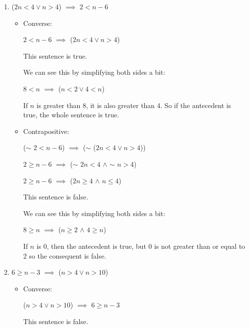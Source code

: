 \documentclass[12pt,letterpaper]{article}
\begin{document}
\begin{enumerate}
\begin{enumerate}
\begin{enumerate}
\begin{itemize}
              \end{itemize}

            \setcounter{enumiii}{5}
            \item
              ($2n < 4 \lor n > 4$) $\implies$ $2 < n - 6$

              \begin{itemize}
                \item Converse:

                  $2 < n - 6$ $\implies$ ($2n < 4 \lor n > 4$)

                  This sentence is true.

                  We can see this by simplifying both sides a bit:

                  $8 < n$ $\implies$ ($n < 2 \lor 4 < n$)

                  If $n$ is greater than 8, it is also greater than 4.
                  So if the antecedent is true, the whole sentence is true.

                \item Contrapositive:

                  ($\sim$ $2 < n - 6$) $\implies$ ($\sim$ ($2n < 4 \lor n > 4$))

                  $2 \geq n - 6$ $\implies$ ($\sim$ $2n < 4$ $\land$ $\sim$ $n > 4$)

                  $2 \geq n - 6$ $\implies$ ($2n \geq 4$ $\land$ $n \leq 4$)

                  This sentence is false.

                  We can see this by simplifying both sides a bit:

                  $8 \geq n$ $\implies$ ($n \geq 2$ $\land$ $4 \geq n$)

                  If $n$ is 0, then the antecedent is true,
                  but 0 is not greater than or equal to 2 so the consequent is false.
              \end{itemize}

            \item
              $6 \geq n - 3$ $\implies$ ($n > 4 \lor n > 10$)

              \begin{itemize}
                \item Converse:

                  ($n > 4 \lor n > 10$) $\implies$ $6 \geq n - 3$

                  This sentence is false.


\end{itemize}
\end{enumerate}
\end{enumerate}
\end{enumerate}
\end{document}
